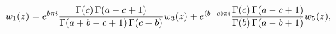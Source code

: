 \[w_{1}(z)=e^{b\pi i}\frac{\mathop{\Gamma\/}\nolimits\!\left(c\right)\mathop{%
\Gamma\/}\nolimits\!\left(a-c+1\right)}{\mathop{\Gamma\/}\nolimits\!\left(a+b-%
c+1\right)\mathop{\Gamma\/}\nolimits\!\left(c-b\right)}w_{3}(z)+e^{(b-c)\pi i}%
\frac{\mathop{\Gamma\/}\nolimits\!\left(c\right)\mathop{\Gamma\/}\nolimits\!%
\left(a-c+1\right)}{\mathop{\Gamma\/}\nolimits\!\left(b\right)\mathop{\Gamma\/%
}\nolimits\!\left(a-b+1\right)}w_{5}(z),\]
